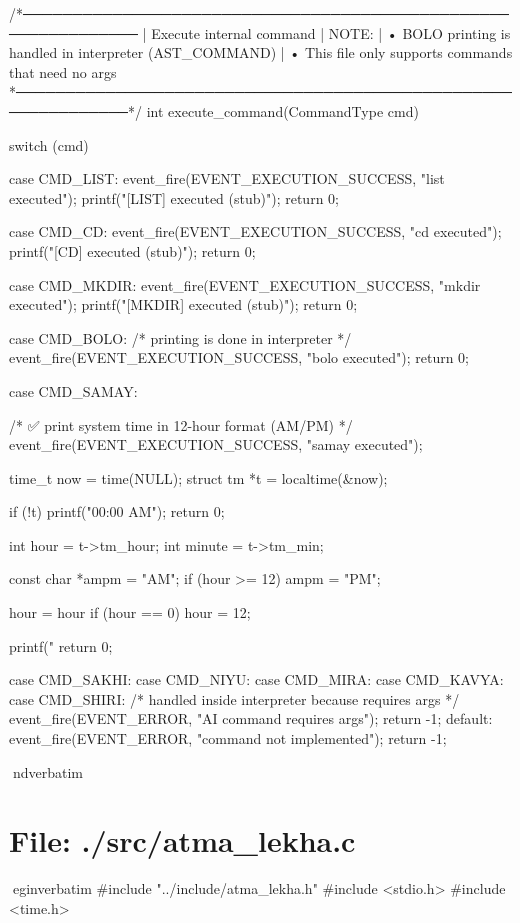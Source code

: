 \documentclass{article}
\begin{document}
/*──────────────────────────────────────────────────────────────
 | Execute internal command
 | NOTE:
 |  • BOLO printing is handled in interpreter (AST_COMMAND)
 |  • This file only supports commands that need no args
 *──────────────────────────────────────────────────────────────*/
int execute_command(CommandType cmd)
{
    switch (cmd) {

        case CMD_LIST:
            event_fire(EVENT_EXECUTION_SUCCESS, "list executed");
            printf("[LIST] executed (stub)\n");
            return 0;

        case CMD_CD:
            event_fire(EVENT_EXECUTION_SUCCESS, "cd executed");
            printf("[CD] executed (stub)\n");
            return 0;

        case CMD_MKDIR:
            event_fire(EVENT_EXECUTION_SUCCESS, "mkdir executed");
            printf("[MKDIR] executed (stub)\n");
            return 0;

        case CMD_BOLO:
            /* printing is done in interpreter */
            event_fire(EVENT_EXECUTION_SUCCESS, "bolo executed");
            return 0;

        case CMD_SAMAY: {
            /* ✅ print system time in 12-hour format (AM/PM) */
            event_fire(EVENT_EXECUTION_SUCCESS, "samay executed");

            time_t now = time(NULL);
            struct tm *t = localtime(&now);

            if (!t) {
                printf("00:00 AM\n");
                return 0;
            }

            int hour = t->tm_hour;
            int minute = t->tm_min;

            const char *ampm = "AM";
            if (hour >= 12) ampm = "PM";

            hour = hour %
            if (hour == 0) hour = 12;

            printf("%
            return 0;
        }

        case CMD_SAKHI:
        case CMD_NIYU:
        case CMD_MIRA:
        case CMD_KAVYA:
        case CMD_SHIRI:
            /* handled inside interpreter because requires args */
            event_fire(EVENT_ERROR, "AI command requires args");
            return -1;
        default:
            event_fire(EVENT_ERROR, "command not implemented");
            return -1;
    }
}
nd{verbatim}
\section*{File: ./src/atma_lekha.c}
egin{verbatim}
#include "../include/atma_lekha.h"
#include <stdio.h>
#include <time.h>
\end{document}

